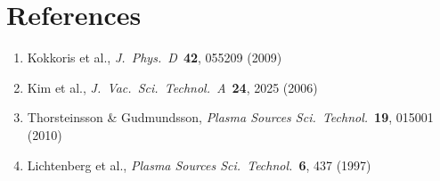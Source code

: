 \documentclass[11pt,a4paper]{article}
\begin{document}
\section{References}
\begin{enumerate}[nosep]
\item Kokkoris et al., \textit{J.\ Phys.\ D}\ \textbf{42}, 055209 (2009)
\item Kim et al., \textit{J.\ Vac.\ Sci.\ Technol.\ A}\ \textbf{24}, 2025 (2006)
\item Thorsteinsson \& Gudmundsson, \textit{Plasma Sources Sci.\ Technol.}\ \textbf{19}, 015001 (2010)
\item Lichtenberg et al., \textit{Plasma Sources Sci.\ Technol.}\ \textbf{6}, 437 (1997)
\end{enumerate}
\end{document}

